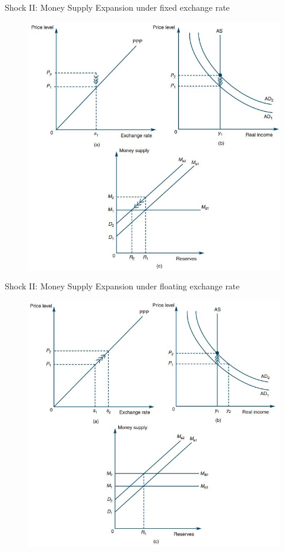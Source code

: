 \documentclass[10pt,hyperref={CJKbookmarks=true},xcolor=dvipsnames,aspectratio=169]{beamer}
\begin{document}
\begin{frame}{Shock II: Money Supply Expansion under fixed exchange rate}
\begin{figure}


\includegraphics[scale=0.4]{fig/boptheory/lec08-20.JPG}

\end{figure}

\end{frame}

\begin{frame}{Shock II: Money Supply Expansion under floating exchange rate}


\begin{figure}


\includegraphics[scale=0.4]{fig/boptheory/lec08-21.JPG}
\end{figure}

\end{frame}
\end{document}
